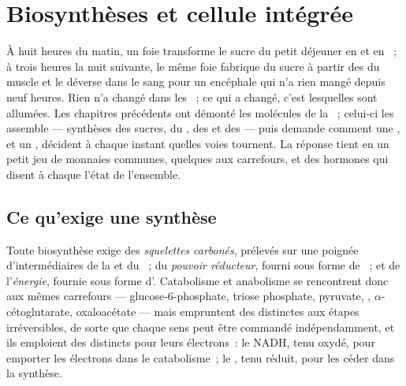 \chapter{Biosynthèses et cellule intégrée}\label{ch:b1:biosyntheses-integration}

À huit heures du matin, un foie transforme le sucre du petit déjeuner en
 et en ~; à trois heures la nuit suivante, le même foie
fabrique du sucre à partir des  du muscle et le déverse
dans le sang pour un encéphale qui n'a rien mangé depuis neuf heures.
Rien n'a changé dans les ~; ce qui a changé, c'est lesquelles
sont allumées. Les chapitres précédents ont démonté les molécules de la
~; celui-ci les assemble --- synthèses des sucres, du ,
des  et des  --- puis demande comment une ,
et un , décident à chaque instant quelles voies tournent. La
réponse tient en un petit jeu de monnaies communes, quelques  aux
carrefours, et des hormones qui disent à chaque  l'état de
l'ensemble.

\section{Ce qu'exige une synthèse}

\begin{proposition}\label{prop:b1:biosyntheses-integration:needs}
Toute biosynthèse exige des \emph{squelettes carbonés}, prélevés sur une
poignée d'intermédiaires de la  et du ~; du
\emph{pouvoir réducteur}, fourni sous forme de ~; et de
l'\emph{énergie}, fournie sous forme d'. Catabolisme et anabolisme se
rencontrent donc aux mêmes carrefours --- glucose-6-phosphate, triose
phosphate, pyruvate, , $\alpha$-cétoglutarate, oxaloacétate
--- mais empruntent des  distinctes aux étapes irréversibles, de
sorte que chaque sens peut être commandé indépendamment, et ils
emploient des  distincts pour leurs électrons~: le NADH, tenu
oxydé, pour emporter les électrons dans le catabolisme~; le , tenu
réduit, pour les céder dans la synthèse.
\end{proposition}

